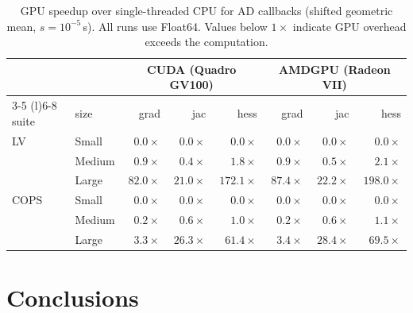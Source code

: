 \documentclass[11pt]{article}
\begin{document}
\begin{table}[t]
\centering
\caption{GPU speedup over single-threaded CPU for AD callbacks (shifted geometric mean, $s = 10^{-5}$\,s). All runs use Float64. Values below $1\times$ indicate GPU overhead exceeds the computation.}
\label{tab:gpu}
\begin{tabular}{ll rrr rrr}
  \toprule
  & & \multicolumn{3}{c}{\textbf{CUDA} (Quadro GV100)} & \multicolumn{3}{c}{\textbf{AMDGPU} (Radeon VII)} \\
  \cmidrule(lr){3-5} \cmidrule(l){6-8}
  suite & size & grad & jac & hess & grad & jac & hess \\
  \midrule
  LV & Small & $0.0\times$ & $0.0\times$ & $0.0\times$ & $0.0\times$ & $0.0\times$ & $0.0\times$ \\
   & Medium & $0.9\times$ & $0.4\times$ & $1.8\times$ & $0.9\times$ & $0.5\times$ & $2.1\times$ \\
   & Large & $82.0\times$ & $21.0\times$ & $172.1\times$ & $87.4\times$ & $22.2\times$ & $198.0\times$ \\
  \midrule
  COPS & Small & $0.0\times$ & $0.0\times$ & $0.0\times$ & $0.0\times$ & $0.0\times$ & $0.0\times$ \\
   & Medium & $0.2\times$ & $0.6\times$ & $1.0\times$ & $0.2\times$ & $0.6\times$ & $1.1\times$ \\
   & Large & $3.3\times$ & $26.3\times$ & $61.4\times$ & $3.4\times$ & $28.4\times$ & $69.5\times$ \\
  \bottomrule
\end{tabular}
\end{table}

\section{Conclusions}
\label{sec:conclusions}
\end{document}
